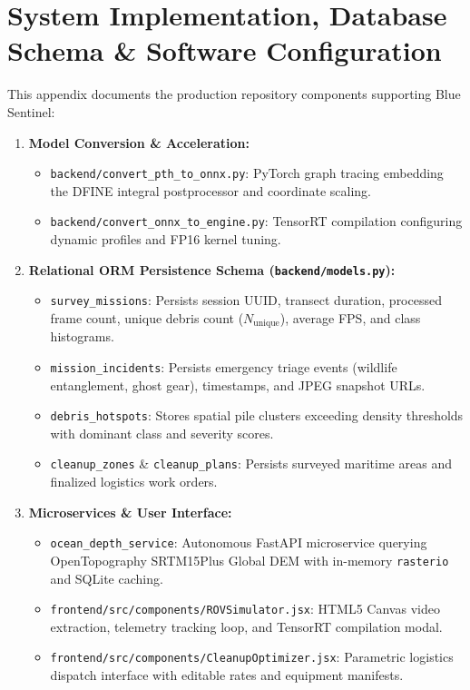 \documentclass[conference]{IEEEtran}
\begin{document}
\section{System Implementation, Database Schema \& Software Configuration}
This appendix documents the production repository components supporting Blue Sentinel:
\begin{enumerate}
    \item \textbf{Model Conversion \& Acceleration:}
    \begin{itemize}
        \item \texttt{backend/convert\_pth\_to\_onnx.py}: PyTorch graph tracing embedding the DFINE integral postprocessor and coordinate scaling.
        \item \texttt{backend/convert\_onnx\_to\_engine.py}: TensorRT compilation configuring dynamic profiles and FP16 kernel tuning.
    \end{itemize}
    \item \textbf{Relational ORM Persistence Schema (\texttt{backend/models.py}):}
    \begin{itemize}
        \item \texttt{survey\_missions}: Persists session UUID, transect duration, processed frame count, unique debris count ($N_{\text{unique}}$), average FPS, and class histograms.
        \item \texttt{mission\_incidents}: Persists emergency triage events (wildlife entanglement, ghost gear), timestamps, and JPEG snapshot URLs.
        \item \texttt{debris\_hotspots}: Stores spatial pile clusters exceeding density thresholds with dominant class and severity scores.
        \item \texttt{cleanup\_zones} \& \texttt{cleanup\_plans}: Persists surveyed maritime areas and finalized logistics work orders.
    \end{itemize}
    \item \textbf{Microservices \& User Interface:}
    \begin{itemize}
        \item \texttt{ocean\_depth\_service}: Autonomous FastAPI microservice querying OpenTopography SRTM15Plus Global DEM with in-memory \texttt{rasterio} and SQLite caching.
        \item \texttt{frontend/src/components/ROVSimulator.jsx}: HTML5 Canvas video extraction, telemetry tracking loop, and TensorRT compilation modal.
        \item \texttt{frontend/src/components/CleanupOptimizer.jsx}: Parametric logistics dispatch interface with editable rates and equipment manifests.
    \end{itemize}
\end{enumerate}
\end{document}
